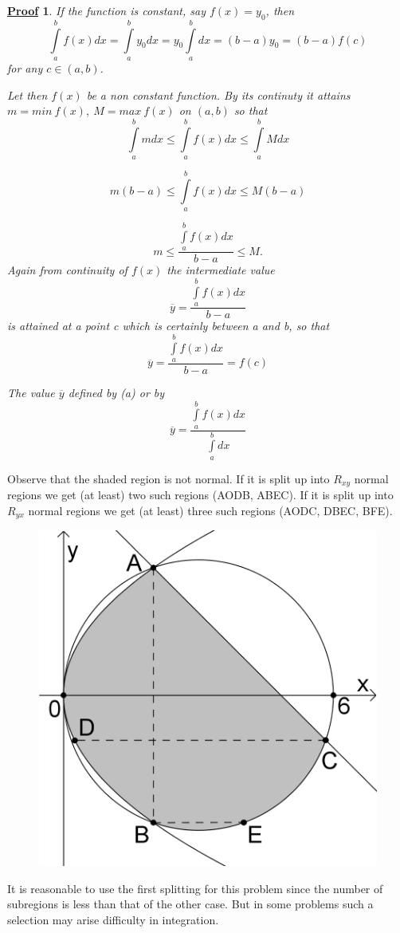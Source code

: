 \documentclass[11pt]{amsbook}
\newtheorem*{prf}{\underline{Proof}}
\begin{document}
\begin{prf}
If the function is constant, say $f(x)=y_0$, then $$\int\limits_{a}^{b} f(x)dx=\int\limits_{a}^{b} y_0 dx=y_0 \int\limits_{a}^{b} dx=(b-a)y_0 =(b-a)f(c)$$ for any $c\in (a,b)$.

Let then $f(x)$ be a non constant function. By its continuty it attains $m=min \ f(x), \ M=max \ f(x)$ on $(a,b)$ so that $$\int\limits_a^b mdx \leq \int\limits_a^b f(x)dx \leq \int\limits_a^b Mdx$$ 

$$m(b-a) \leq \int\limits_a^b f(x)dx \leq M(b-a)$$

$$m \leq \frac{\int\limits_a^b f(x)dx}{b-a} \leq M.$$ Again from continuity of $f(x)$ the intermediate value $$\overline{y}=\frac{\int\limits_a^b f(x)dx}{b-a}$$ is attained at a point c which is certainly between a and b, so that 
\[
 \overline{y}=\frac{\int\limits_a^b f(x)dx}{b-a}=f(c) \tag{a}
\]

\par The value $\overline{y}$ defined by (a) or by $$\overline{y}=\frac{\int\limits_a^b f(x)dx}{\int\limits_a^b dx}$$
\end{prf}


Observe that the shaded region is not normal. If it is split up into $R_{xy}$ normal regions we get (at least) two such regions (AODB, ABEC). If it is split up into $R_{yx}$ normal regions we get (at least) three such regions (AODC, DBEC, BFE).
\begin{figure}[htbp]
	\centering
	\includegraphics[width=0.4\columnwidth]{images/b1p2-368-fig01}
\end{figure}

It is reasonable to use the first splitting for this problem since the number of subregions is less than that of the other case. But in some problems such a selection may arise difficulty in integration.
\end{document}
